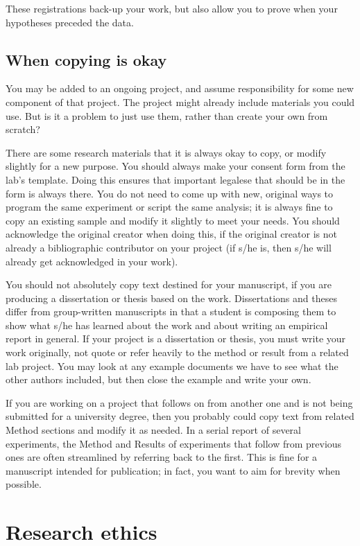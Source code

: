 \documentclass[12pt,]{book}
\theoremstyle{definition}
\theoremstyle{definition}
\theoremstyle{definition}
\theoremstyle{remark}
\begin{document}
These registrations back-up your work, but also allow you to prove when
your hypotheses preceded the data.

\section{When copying is okay}\label{when-copying-is-okay}

You may be added to an ongoing project, and assume responsibility for
some new component of that project. The project might already include
materials you could use. But is it a problem to just use them, rather
than create your own from scratch?

There are some research materials that it is always okay to copy, or
modify slightly for a new purpose. You should always make your consent
form from the lab's template. Doing this ensures that important legalese
that should be in the form is always there. You do not need to come up
with new, original ways to program the same experiment or script the
same analysis; it is always fine to copy an existing sample and modify
it slightly to meet your needs. You should acknowledge the original
creator when doing this, if the original creator is not already a
bibliographic contributor on your project (if s/he is, then s/he will
already get acknowledged in your work).

You should not absolutely copy text destined for your manuscript, if you
are producing a dissertation or thesis based on the work. Dissertations
and theses differ from group-written manuscripts in that a student is
composing them to show what s/he has learned about the work and about
writing an empirical report in general. If your project is a
dissertation or thesis, you must write your work originally, not quote
or refer heavily to the method or result from a related lab project. You
may look at any example documents we have to see what the other authors
included, but then close the example and write your own.

If you are working on a project that follows on from another one and is
not being submitted for a university degree, then you probably could
copy text from related Method sections and modify it as needed. In a
serial report of several experiments, the Method and Results of
experiments that follow from previous ones are often streamlined by
referring back to the first. This is fine for a manuscript intended for
publication; in fact, you want to aim for brevity when possible.

\chapter{Research ethics}\label{research-ethics}
\end{document}
